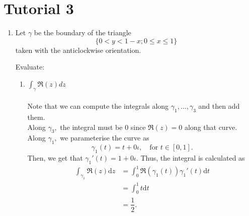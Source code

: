 \documentclass[12pt]{article}
\theoremstyle{definition}
\numberwithin{thm}{section}
\begin{document}
%
%
%
%

\newpage\section{Tutorial 3}

\begin{enumerate}
	\item Let $\gamma$ be the boundary of the triangle
	\begin{equation*} 
		\{0 < y < 1 - x; 0 \le x \le 1\}
	\end{equation*}
	taken with the anticlockwise orientation. 

	\begin{center}
	\end{center}

	Evaluate:
	\begin{enumerate}
		\item $\displaystyle\int_\gamma\Re(z)dz$\\~\\
		Note that we can compute the integrals along $\gamma_1, \ldots, \gamma_3$ and then add them.\\
		Along $\gamma_3,$ the integral must be $0$ since $\Re(z) = 0$ along that curve.\\
		Along $\gamma_1,$ we parameterise the curve as
		\begin{equation*} 
			\gamma_1(t) = t + 0\iota, \quad \text{for } t \in [0, 1].
		\end{equation*}
		Then, we get that $\gamma_1'(t) = 1 + 0\iota.$ Thus, the integral is calculated as
		\begin{align*} 
			\int_{\gamma_1}\Re(z){\mathrm{d}}z &= \int_{0}^{1} \Re(\gamma_1(t))\gamma_1'(t) {\mathrm{d}}t\\
			&= \int_{0}^{1} t {\mathrm{d}}t\\
			&= \dfrac{1}{2}.
		\end{align*}


\end{enumerate}
\end{enumerate}
\end{document}
